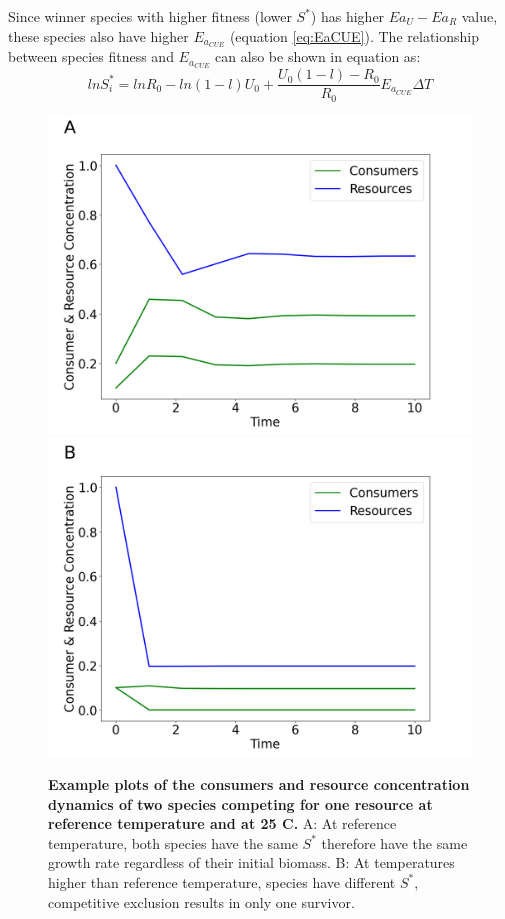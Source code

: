 Since winner species with higher fitness (lower $S^*$) has higher $Ea_U - Ea_R$ value, these species also have higher $E_{a_{CUE}}$ (equation \ref{eq:EaCUE}). The relationship between species fitness and $E_{a_{CUE}}$ can also be shown in equation as:
\begin{equation}\label{eq:S_Ea}
lnS^*_i = lnR_0 - ln(1-l)U_0 + \frac{U_0(1-l) - R_0}{R_0}E_{a_{CUE}}\Delta T
\end{equation}

\begin{figure}[H]
    \centering
    \includegraphics[scale=0.27]{./Figures/2_consumer_Tref.png}
    \includegraphics[scale=0.27]{./Figures/2_consumer_25C.png}
    \caption{\textbf{Example plots of the consumers and resource concentration dynamics of two species competing for one resource at reference temperature and at 25 \textdegree C.} A: At reference temperature, both species have the same $S^*$ therefore have the same growth rate regardless of their initial biomass. B: At temperatures higher than reference temperature, species have different $S^*$, competitive exclusion results in only one survivor.} 
    \label{fig:2_example}
\end{figure}

